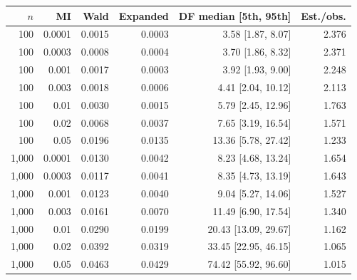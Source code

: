 \begin{tabular}{@{}rrrrrr@{}}\toprule
\(n\) & MI & Wald & Expanded & DF median [5th, 95th] & Est./obs.\\\midrule
100 & 0.0001 & 0.0015 & 0.0003 & 3.58 [1.87, 8.07] & 2.376\\
100 & 0.0003 & 0.0008 & 0.0004 & 3.70 [1.86, 8.32] & 2.371\\
100 & 0.001 & 0.0017 & 0.0003 & 3.92 [1.93, 9.00] & 2.248\\
100 & 0.003 & 0.0018 & 0.0006 & 4.41 [2.04, 10.12] & 2.113\\
100 & 0.01 & 0.0030 & 0.0015 & 5.79 [2.45, 12.96] & 1.763\\
100 & 0.02 & 0.0068 & 0.0037 & 7.65 [3.19, 16.54] & 1.571\\
100 & 0.05 & 0.0196 & 0.0135 & 13.36 [5.78, 27.42] & 1.233\\
1,000 & 0.0001 & 0.0130 & 0.0042 & 8.23 [4.68, 13.24] & 1.654\\
1,000 & 0.0003 & 0.0117 & 0.0041 & 8.35 [4.73, 13.19] & 1.643\\
1,000 & 0.001 & 0.0123 & 0.0040 & 9.04 [5.27, 14.06] & 1.527\\
1,000 & 0.003 & 0.0161 & 0.0070 & 11.49 [6.90, 17.54] & 1.340\\
1,000 & 0.01 & 0.0290 & 0.0199 & 20.43 [13.09, 29.67] & 1.162\\
1,000 & 0.02 & 0.0392 & 0.0319 & 33.45 [22.95, 46.15] & 1.065\\
1,000 & 0.05 & 0.0463 & 0.0429 & 74.42 [55.92, 96.60] & 1.015\\
\bottomrule\end{tabular}

